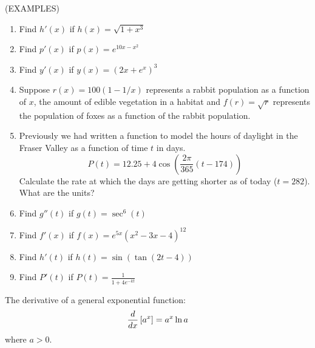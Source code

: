 \documentclass[11pt]{article}
\begin{document}
  (EXAMPLES)
\begin{enumerate}
\item{Find $h'(x)$ if $h(x) = \sqrt{1+x^3}$}
  \vspace{1in}
\item{Find $p'(x)$ if $p(x)=e^{10x-x^{2}}$}
    \vspace{1in}
  \item{Find $y'(x)$ if $y(x) = (2x + e^x)^3$}
    \vspace{1in}


    \item{Suppose $r(x) = 100(1-1/x)$ represents a rabbit population as a function of $x$, the amount of edible vegetation in a habitat and
      $f(r) = \sqrt{r}$ represents the population of foxes as a function of the rabbit population.}
      \vspace{2in}

    \item{Previously we had written a function to model the hours of daylight in the Fraser Valley as a function of time $t$ in days.
      \begin{displaymath}
P(t) = 12.25 + 4\cos{\left(\frac{2\pi}{365}(t-174)  \right)}
      \end{displaymath}
      Calculate the rate at which the days are getting shorter as of today ($t=282$).  What are the units?
      }


\vspace{1in}

      \item{Find $g''(t)$ if $g(t) = \sec^6(t)$}
    \vspace{1.2in}

      \item{Find $f'(x)$ if $f(x) = e^{5x}(x^2-3x-4)^{12}$}
    \vspace{1.2in}
      \item{Find $h'(t)$ if $h(t) = \sin{(\tan{(2t-4)})}$}
    \vspace{1.2in}

  \item{Find $P'(t)$ if $P(t) = \frac{1}{1+4e^{-kt}}$}
    \vspace{1in}


  \end{enumerate}

\pagebreak


The derivative of a general exponential function:
\begin{displaymath}
  \frac{d}{dx}\left[a^x  \right] = a^x\ln{a}\\
  \end{displaymath}
where $a>0$. 
\end{document}
